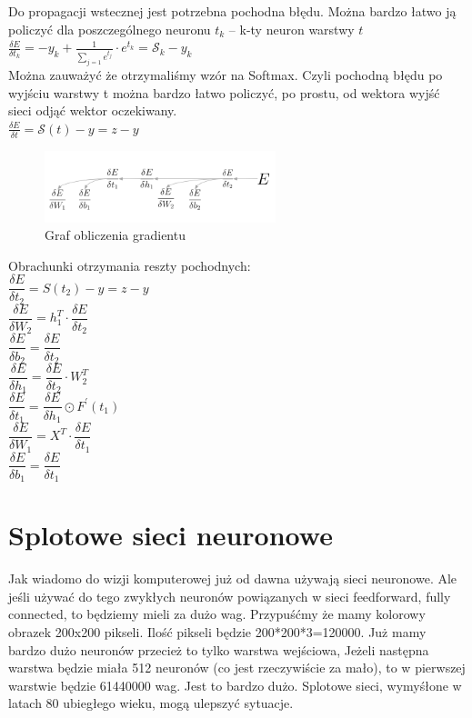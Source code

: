 \documentclass{article}
\begin{document}
Do propagacji wstecznej jest potrzebna pochodna błędu. Można bardzo łatwo ją policzyć dla poszczególnego neuronu $t_k$ -- k-ty neuron warstwy $t$ \\
$\frac{\delta E}{\delta t_k} = -y_k + \frac{1}{\sum_{j=1}e^{t_j}}\cdot e^{t_k} = \mathcal{S}_k - y_k$\\

Można zauważyć że otrzymaliśmy wzór na Softmax. Czyli pochodną błędu po wyjściu warstwy t można bardzo łatwo policzyć, po prostu, od wektora wyjść sieci odjąć wektor oczekiwany.\\ 
$\frac{\delta E}{\delta t} = \mathcal{S}(t) - y = z - y$

\begin{figure}[H]
	\centering
	\includegraphics[width=0.6\textwidth,keepaspectratio=true]{gradient_graph}
	\caption{Graf obliczenia gradientu}
	\label{gradien_graph}
\end{figure}

\begin{flushleft}
Obrachunki otrzymania reszty pochodnych:\\
$\dfrac{\delta E}{\delta t_2} = S(t_2)-y=z-y$\\
\vspace{5mm}
$\dfrac{\delta E}{\delta W_2} = h_1^T \cdot \dfrac{\delta E}{\delta t_2}$\\
$\dfrac{\delta E}{\delta b_2} = \dfrac{\delta E}{\delta t_2}$\\
\vspace{5mm}
$\dfrac{\delta E}{\delta h_1} = \dfrac{\delta E}{\delta t_2} \cdot W_2^T$\\
$\dfrac{\delta E}{\delta t_1} = \dfrac{\delta E}{\delta h_1} \odot F^\prime (t_1)$\\
\vspace{5mm}
$\dfrac{\delta E}{\delta W_1} = X^T \cdot \dfrac{\delta E}{\delta t_1}$\\
$\dfrac{\delta E}{\delta b_1} = \dfrac{\delta E}{\delta t_1}$
\end{flushleft}

\section{Splotowe sieci neuronowe}
Jak wiadomo do wizji komputerowej już od dawna używają sieci neuronowe. Ale jeśli używać do tego zwykłych neuronów powiązanych w sieci feedforward, fully connected, to będziemy mieli za dużo wag. Przypuśćmy że mamy kolorowy obrazek 200x200 pikseli. Ilość pikseli będzie 200*200*3=120000. Już mamy bardzo dużo neuronów przecież to tylko warstwa wejściowa, Jeżeli następna warstwa będzie miała 512 neuronów (co jest rzeczywiście za mało), to w pierwszej warstwie będzie 61440000 wag. Jest to bardzo dużo. 
Splotowe sieci, wymyśłone w latach 80 ubiegłego wieku, mogą ulepszyć sytuacje.
\end{document}
